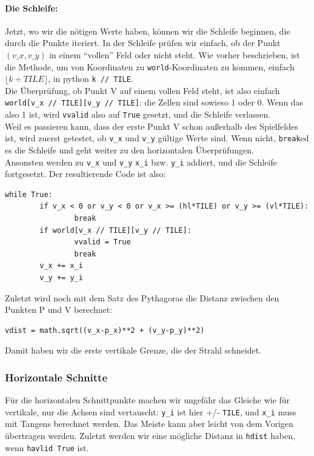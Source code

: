 \documentclass[a4paper,12pt]{report}
\begin{document}
\paragraph{Die Schleife:}
Jetzt, wo wir die n\"otigen Werte haben, k\"onnen wir die Schleife beginnen, die durch die Punkte iteriert. In der Schleife pr\"ufen wir einfach, ob der Punkt $(v\_x,v\_y)$ in einem ``vollen'' Feld oder nicht steht. Wie vorher beschrieben, ist die Methode, um von Koordinaten zu \texttt{world}-Koordinaten zu kommen, einfach $\lfloor k \div TILE \rfloor$, in python \texttt{k // TILE}. \\
Die Überpr\"ufung, ob Punkt V auf einem vollen Feld steht, ist also einfach \texttt{world[v\_x // TILE][v\_y // TILE]}: die Zellen sind sowieso 1 oder 0. Wenn das also 1 ist, wird \texttt{vvalid} also auf \texttt{True} gesetzt, und die Schleife verlassen. \\
Weil es passieren kann, dass der erste Punkt V schon au\ss erhalb des Spielfeldes ist, wird zuerst getestet, ob \texttt{v\_x} und \texttt{v\_y} g\"ultige Werte sind. Wenn nicht, \texttt{break}ed es die Schleife und geht weiter zu den horizontalen Überpr\"ufungen. \\
Ansonsten werden zu \texttt{v\_x} und \texttt{v\_y} \texttt{x\_i} bzw. \texttt{y\_i} addiert, und die Schleife fortgesetzt.
Der resultierende Code ist also:
\begin{Verbatim}[baselinestretch=1.0, xleftmargin=1cm]
while True:
        if v_x < 0 or v_y < 0 or v_x >= (hl*TILE) or v_y >= (vl*TILE):
                break
        if world[v_x // TILE][v_y // TILE]:
                vvalid = True
                break
        v_x += x_i
        v_y += y_i
\end{Verbatim}

Zuletzt wird noch mit dem Satz des Pythagoras die Distanz zwischen den Punkten P und V berechnet:
\begin{Verbatim}[baselinestretch=1.0, xleftmargin=1cm]
vdist = math.sqrt((v_x-p_x)**2 + (v_y-p_y)**2)
\end{Verbatim}
Damit haben wir die erste vertikale Grenze, die der Strahl schneidet.

\subsubsection{Horizontale Schnitte}
F\"ur die horizontalen Schnittpunkte machen wir ungef\"ahr das Gleiche wie f\"ur vertikale, nur die Achsen sind vertauscht: \texttt{y\_i} ist hier +/- \texttt{TILE}, und \texttt{x\_i} muss mit Tangens berechnet werden. Das Meiste kann aber leicht von dem Vorigen \"ubertragen werden. Zuletzt werden wir eine m\"ogliche Distanz in \texttt{hdist} haben, wenn \texttt{havlid True} ist.
\end{document}
